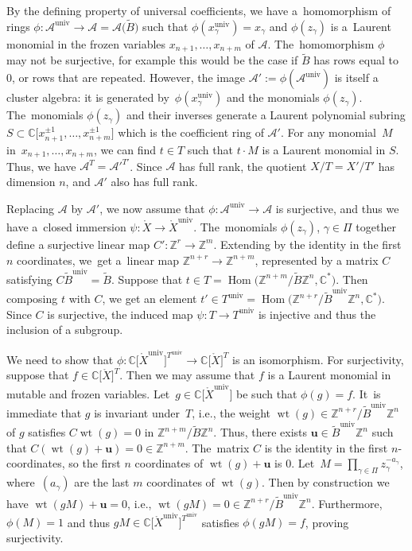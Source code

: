 \documentclass[10pt,a4paper]{amsart}
\def\C{{\mathbb C}}
\def\Z{{\mathbb Z}}
\def\A{{\mathcal{A}}}
\def\Xo{{\mathring{X}}}
\def\u{{\mathbf{u}}}
\def\Hom{\operatorname{Hom}}
\def\univ{{\operatorname{univ}}}
\def\tB{{\tilde B}}
\def\wt{\operatorname{wt}}
\def\tB{{\tilde B}}
\numberwithin{equation}{section}
\begin{document}
\bigskip{}
By the defining property of universal coefficients, we have a~homomorphism of rings $\phi\colon \A^\univ \to \A= \A\big(\tB\big)$ such that $\phi(x_\gamma^\univ) = x_\gamma$ and $\phi(z_\gamma)$ is a~Laurent monomial in the frozen variables $x_{n+1},\dots,x_{n+m}$ of $\A$. The~homomorphism $\phi$ may not be surjective, for example this would be the case if $\tB$ has rows equal to 0, or rows that are repeated.
However, the image $\A' := \phi(\A^\univ)$ is itself a cluster algebra: it is generated by~$\phi(x_\gamma^\univ)$ and the monomials $\phi(z_\gamma)$. The~monomials $\phi(z_\gamma)$ and their inverses generate a Laurent polynomial subring $S \subset \C\big[x_{n+1}^{\pm 1}, \dots, x_{n+m}^{\pm 1}\big]$ which is the coefficient ring of $\A'$. For any monomial~$M$ in~$x_{n+1},\dots,x_{n+m}$, we can find $t \in T$ such that $t \cdot M$ is a Laurent monomial in $S$. Thus, we have $\A^T = \A'^{T'}$. Since $\A$ has full rank, the quotient $X/T = X'/T'$ has dimension $n$, and $\A'$ also has full rank.

Replacing $\A$ by $\A'$, we now assume that $\phi\colon \A^\univ \to \A$ is surjective, and thus we have a~clo\-sed immersion $\psi\colon \Xo \to \Xo^\univ$. The~monomials $\phi(z_\gamma)$, $\gamma \in \Pi$ together define a sur\-jec\-tive linear map $C'\colon \Z^r \to \Z^m$. Extending by the identity in the first $n$ coordinates, we~get a~linear map $\Z^{n+r} \to \Z^{n+m}$, represented by a matrix $C$ satisfying $C \tB^\univ = \tB$. Suppose that $t \in T= \Hom\big(\Z^{n+m}/\tB \Z^n, \C^\ast\big)$. Then composing $t$ with $C$, we get an element $t' \in T^\univ =\Hom\big(\Z^{n+r}/\tB^\univ \Z^n,\C^\ast\big)$. Since $C$ is surjective, the induced map $\psi\colon T \to T^\univ$ is injective and thus the inclusion of a subgroup.

We need to show that $\phi\colon \C\big[\Xo^\univ\big]^{T^\univ} \to \C\big[\Xo\big]^T$ is an isomorphism. For surjectivity, suppose that $f \in \C\big[\Xo\big]^T$. Then we may assume that $f$ is a Laurent monomial in mutable and frozen variables. Let~$g \in \C\big[\Xo^\univ\big]$ be such that $\phi(g) = f$. It~is immediate that $g$ is invariant under~$T$, i.e., the weight $\wt(g) \in \Z^{n+r}/\tB^\univ \Z^n$ of $g$ satisfies $C \wt(g) = 0$ in $\Z^{n+m}/\tB \Z^n$. Thus, there exists $\u \in \tB^\univ \Z^n$ such that $C(\wt(g) + \u) = 0 \in \Z^{n+m}$. The~matrix $C$ is the identity in the first $n$-coordinates, so the first $n$ coordinates of $\wt(g)+\u$ is 0. Let~$M = \prod_{\gamma \in \Pi} z_\gamma^{-a_\gamma}$, where~$(a_\gamma)$ are the last $m$ coordinates of $\wt(g)$. Then by construction we have $\wt(gM)+\u = 0$, i.e., $\wt(gM) = 0 \in \Z^{n+r}/\tB^\univ \Z^n$. Furthermore, $\phi(M) = 1$ and thus $gM \in \C\big[\Xo^\univ\big]^{T^\univ}$ satisfies $\phi(gM) = f$, proving surjectivity.
\end{document}
